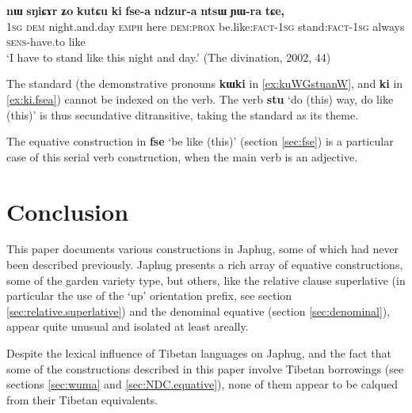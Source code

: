 \documentclass[oneside,a4paper,11pt]{article}
\newcommand{\ipa}[1]{{\phon\textbf{#1}}} %
\begin{document}
\begin{exe}
\ex \label{ex:ki.fsea}
\gll \ipa{aʑo} 	\ipa{nɯ} 	\ipa{sŋiɕɤr} 	\ipa{ʑo} 	\ipa{kutɕu} 	\ipa{ki} 	\ipa{fse-a} 	\ipa{ndzur-a} 	\ipa{ntsɯ} 	\ipa{ɲɯ-ra} 	\ipa{tɕe,} \\
\textsc{1sg} \textsc{dem} night.and.day \textsc{emph} here \textsc{dem:prox} be.like:\textsc{fact-1sg} stand:\textsc{fact-1sg} always \textsc{sens}-have.to like \\
\glt `I have to stand like this night and day.' (The divination, 2002, 44)
\end{exe}

The standard (the demonstrative pronouns \ipa{kɯki} in \ref{ex:kuWGstuanW}, and \ipa{ki} in \ref{ex:ki.fsea})  cannot be indexed on the verb. The verb \ipa{stu} `do (this) way, do like (this)' is thus secundative ditransitive, taking the standard as its theme.

The equative construction in \ipa{fse} `be like (this)' (section \ref{sec:fse}) is a particular case of this serial verb construction, when the main verb is an adjective.

\section*{Conclusion}
This paper documents various constructions in Japhug, some of which had never been described previously. Japhug presents a rich array of equative constructions, some of the garden variety type, but others, like the relative clause superlative (in particular the use of the `up' orientation prefix, see section \ref{sec:relative.superlative}) and the denominal equative (section \ref{sec:denominal}), appear quite unusual and isolated at least areally.

Despite the lexical influence of Tibetan languages on Japhug, and the fact that some of the constructions described in this paper involve Tibetan borrowings (see sections \ref{sec:wuma} and \ref{sec:NDC.equative}), none of them appear to be calqued from their Tibetan equivalents.



\end{document}
